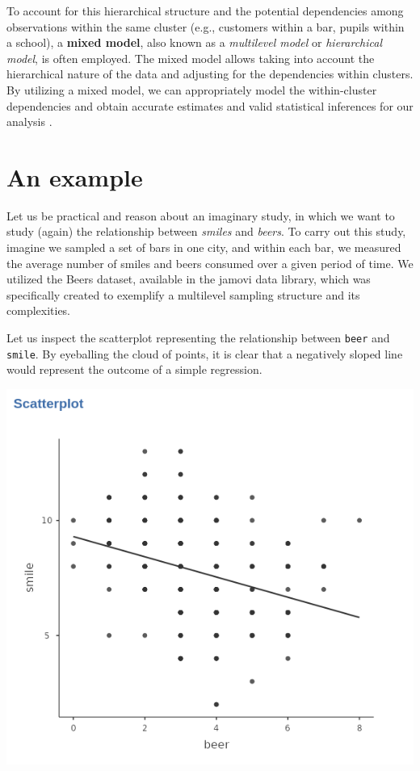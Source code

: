 \documentclass[
]{book}
\begin{document}
To account for this hierarchical structure and the potential dependencies among observations within the same cluster (e.g., customers within a bar, pupils within a school), a \textbf{mixed model}, also known as a \emph{multilevel model} or \emph{hierarchical model}, is often employed. The mixed model allows taking into account the hierarchical nature of the data and adjusting for the dependencies within clusters. By utilizing a mixed model, we can appropriately model the within-cluster dependencies and obtain accurate estimates and valid statistical inferences for our analysis \citep{verbeke2000linear, stroup2013generalized, mcculloch2001generalized}.

\hypertarget{an-example}{%
\section{An example}\label{an-example}}

Let us be practical and reason about an imaginary study, in which we want to study (again) the relationship between \emph{smiles} and \emph{beers}. To carry out this study, imagine we sampled a set of bars in one city, and within each bar, we measured the average number of smiles and beers consumed over a given period of time. We utilized the Beers dataset, available in the {jamovi} data library, which was specifically created to exemplify a multilevel sampling structure and its complexities.

Let us inspect the scatterplot representing the relationship between \texttt{beer} and \texttt{smile}. By eyeballing the cloud of points, it is clear that a negatively sloped line would represent the outcome of a simple regression.

\includegraphics[width=0.8\linewidth]{bookletpics/4_theory_plot1}
\end{document}
